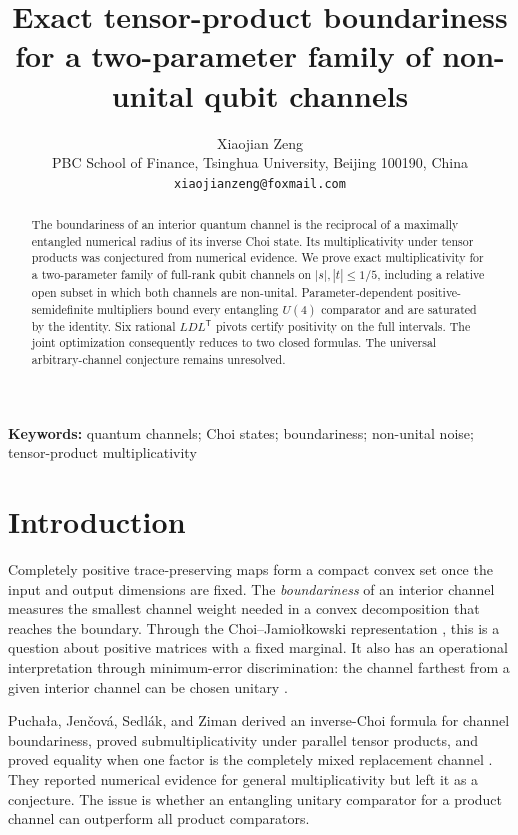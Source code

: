 \documentclass[11pt,a4paper]{article}
\title{Exact tensor-product boundariness for a two-parameter family of non-unital qubit channels}
\author{Xiaojian Zeng\\
\small PBC School of Finance, Tsinghua University, Beijing 100190, China\\
\small \texttt{xiaojianzeng@foxmail.com}}
\date{}
\theoremstyle{remark}
\begin{document}
\maketitle

\begin{abstract}
The boundariness of an interior quantum channel is the reciprocal of a
maximally entangled numerical radius of its inverse Choi state. Its
multiplicativity under tensor products was conjectured from numerical
evidence. We prove exact multiplicativity for a two-parameter family of
full-rank qubit channels on $|s|,|t|\leq 1/5$, including a relative open
subset in which both channels are non-unital. Parameter-dependent
positive-semidefinite multipliers bound every entangling $U(4)$ comparator
and are saturated by the identity. Six rational $LDL^{\mathsf T}$ pivots
certify positivity on the full intervals. The joint optimization consequently
reduces to two closed formulas. The universal arbitrary-channel conjecture
remains unresolved.
\end{abstract}

\noindent\textbf{Keywords:} quantum channels; Choi states; boundariness;
non-unital noise; tensor-product multiplicativity

\section{Introduction}

Completely positive trace-preserving maps form a compact convex set once the
input and output dimensions are fixed.  The \emph{boundariness} of an interior
channel measures the smallest channel weight needed in a convex decomposition
that reaches the boundary.  Through the Choi--Jamio\l kowski representation
\cite{Jamiolkowski1972,Choi1975}, this is a question about positive matrices
with a fixed marginal.  It also has an operational interpretation through
minimum-error discrimination: the channel farthest from a given interior
channel can be chosen unitary \cite{Puchala2015}.

Pucha\l a, Jen\v cov\'a, Sedl\'ak, and Ziman derived an inverse-Choi formula
for channel boundariness, proved submultiplicativity under parallel tensor
products, and proved equality when one factor is the completely mixed
replacement channel \cite{Puchala2015}.  They reported numerical evidence for
general multiplicativity but left it as a conjecture.  The issue is whether an
entangling unitary comparator for a product channel can outperform all product
comparators.
\end{document}

